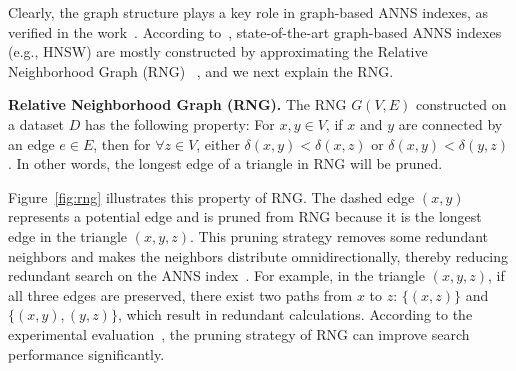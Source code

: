 Clearly, the graph structure plays a key role in graph-based ANNS indexes, as verified in the work~\cite{wang2021comprehensive}. According to~\cite{wang2021comprehensive}, 
state-of-the-art graph-based ANNS indexes (e.g., HNSW) are mostly constructed by approximating the Relative Neighborhood Graph (RNG)~\cite{rng}%
, and we next explain the RNG. 

\noindent\textbf{Relative Neighborhood Graph (RNG).} The RNG $G(V, E)$ constructed on a dataset $D$ has the following property: For $x, y \in V$, if $x$ and $y$ are connected by an edge $e \in E$, then for $\forall z \in V$, either $\delta(x, y) < \delta(x, z)$ or $\delta(x, y) < \delta(y, z)$. In other words, the longest edge of a triangle in RNG will be pruned. 

Figure~\ref{fig:rng} illustrates this property of RNG. The dashed edge $(x, y)$ represents a potential edge and is pruned from RNG because it is the longest edge in the triangle $(x, y, z)$.
This pruning strategy removes some redundant neighbors and makes the neighbors distribute omnidirectionally, thereby reducing 
redundant search on the ANNS index~\cite{wang2021comprehensive}. For example, in the triangle $(x, y, z)$, if all three edges are preserved, there exist two paths from $x$ to $z$: $\{(x, z)\}$ and $\{(x, y), (y, z)\}$, which result in redundant calculations. According to the experimental evaluation~\cite{wang2021comprehensive}, the pruning strategy of RNG can improve search performance significantly. %



